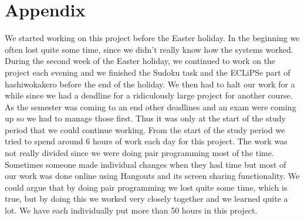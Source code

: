 \documentclass{report}
\newcommand{\mychapter}[2]{
    \setcounter{chapter}{#1}
    \setcounter{section}{0}
    \chapter*{#2}
    \addcontentsline{toc}{chapter}{#2}
}
\begin{document}
\mychapter{4}{Appendix}
We started working on this project before the Easter holiday. In the beginning we often lost quite some time, since we didn't really know how the systems worked. During the second week of the Easter holiday, we continued to work on the project each evening and we finished the Sudoku task and the ECLiPSe part of hashiwokakero before the end of the holiday. We then had to halt our work for a while since we had a deadline for a ridiculously large project for another course. As the semester was coming to an end other deadlines and an exam were coming up so we had to manage those first. Thus it was only at the start of the study period that we could continue working. From the start of the study period we tried to spend around 6 hours of work each day for this project. The work was not really divided since we were doing pair programming most of the time. Sometimes someone made individual changes when they had time but most of our work was done online using Hangouts and its screen sharing functionality. We could argue that by doing pair programming we lost quite some time, which is true, but by doing this we worked very closely together and we learned quite a lot. We have each individually put more than 50 hours in this project.
\end{document}
